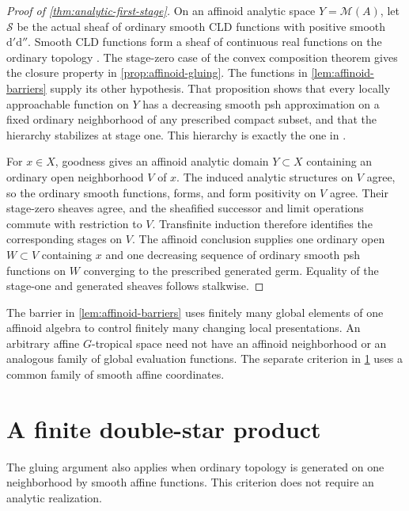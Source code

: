 \documentclass[11pt,a4paper]{amsart}
\begin{document}
\begin{proof}[Proof of \cref{thm:analytic-first-stage}]
On an affinoid analytic space $Y=\mathcal{M}(A)$, let $\mathscr{S}$ be the actual sheaf of ordinary smooth CLD functions with positive smooth $\mathrm{d}'\mathrm{d}''$. Smooth CLD functions form a sheaf of continuous real functions on the ordinary topology \cite[\S6.2.1--6.2.2]{CLD12}. The stage-zero case of the convex composition theorem \cite[Proposition~8.2.1]{CLD12} gives the closure property in \cref{prop:affinoid-gluing}. The functions in \cref{lem:affinoid-barriers} supply its other hypothesis. That proposition shows that every locally approachable function on $Y$ has a decreasing smooth psh approximation on a fixed ordinary neighborhood of any prescribed compact subset, and that the hierarchy stabilizes at stage one. This hierarchy is exactly the one in \cite[Definition~8.1.1 and Lemma~8.1.4]{CLD12}.

For $x\in X$, goodness gives an affinoid analytic domain $Y\subset X$ containing an ordinary open neighborhood $V$ of $x$. The induced analytic structures on $V$ agree, so the ordinary smooth functions, forms, and form positivity on $V$ agree. Their stage-zero sheaves agree, and the sheafified successor and limit operations commute with restriction to $V$. Transfinite induction therefore identifies the corresponding stages on $V$. The affinoid conclusion supplies one ordinary open $W\subset V$ containing $x$ and one decreasing sequence of ordinary smooth psh functions on $W$ converging to the prescribed generated germ. Equality of the stage-one and generated sheaves follows stalkwise.
\end{proof}

\begin{remark}
\label{rem:scope}
The barrier in \cref{lem:affinoid-barriers} uses finitely many global elements of one affinoid algebra to control finitely many changing local presentations. An arbitrary affine $G$-tropical space need not have an affinoid neighborhood or an analogous family of global evaluation functions. The separate criterion in \cref{sec:double-star} uses a common family of smooth affine coordinates.
\end{remark}

\section{A finite double-star product}
\label{sec:double-star}

The gluing argument also applies when ordinary topology is generated on one neighborhood by smooth affine functions. This criterion does not require an analytic realization.
\end{document}
